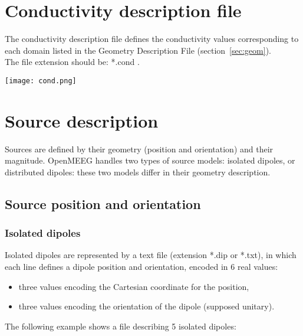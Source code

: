 \section{Conductivity description file}
\label{sec:cond}

\noindent
The conductivity description file defines the conductivity values corresponding to each domain listed in the Geometry Description File (section~\ref{sec:geom}).
\\
The file extension should be: *.cond .\\


\centerline{\texttt{[image: cond.png]}}


\section{Source description}
Sources are defined by their geometry (position and orientation)  and their magnitude.
OpenMEEG handles two types of source models: isolated dipoles, or distributed dipoles: these two models differ in their geometry description.
\subsection{Source position and orientation}
\label{sec:dipoles}
\subsubsection{Isolated dipoles}
\noindent
Isolated dipoles are represented by a text file (extension *.dip or *.txt), in which each line defines a dipole position and orientation, encoded in 6 real values:

\begin{itemize}
    \item three values encoding the Cartesian coordinate for the position,
    \item three values encoding the orientation of the dipole (supposed unitary).
\end{itemize}

\medskip

\noindent
The following example shows a file describing 5 isolated dipoles:

